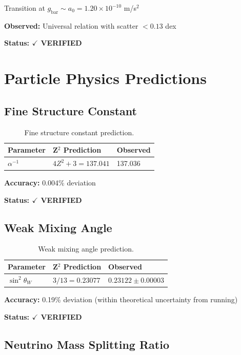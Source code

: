 \documentclass[12pt,a4paper]{article}
\begin{document}
Transition at $g_{\text{bar}} \sim a_0 = 1.20 \times 10^{-10}$ m/s$^2$

\textbf{Observed:} Universal relation with scatter $< 0.13$ dex

\textbf{Status: $\checkmark$ VERIFIED}

\section{Particle Physics Predictions}

\subsection{Fine Structure Constant}

\begin{table}[h]
\centering
\begin{tabular}{@{}lll@{}}
\toprule
Parameter & Z$^2$ Prediction & Observed \\
\midrule
$\alpha^{-1}$ & $4Z^2 + 3 = 137.041$ & 137.036 \\
\bottomrule
\end{tabular}
\caption{Fine structure constant prediction.}
\end{table}

\textbf{Accuracy:} 0.004\% deviation

\textbf{Status: $\checkmark$ VERIFIED}

\subsection{Weak Mixing Angle}

\begin{table}[h]
\centering
\begin{tabular}{@{}lll@{}}
\toprule
Parameter & Z$^2$ Prediction & Observed \\
\midrule
$\sin^2\theta_W$ & $3/13 = 0.23077$ & $0.23122 \pm 0.00003$ \\
\bottomrule
\end{tabular}
\caption{Weak mixing angle prediction.}
\end{table}

\textbf{Accuracy:} 0.19\% deviation (within theoretical uncertainty from running)

\textbf{Status: $\checkmark$ VERIFIED}

\subsection{Neutrino Mass Splitting Ratio}
\end{document}
